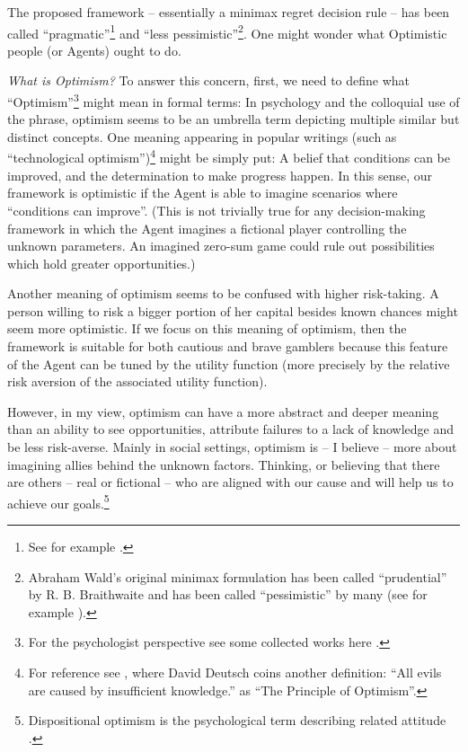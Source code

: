 \documentclass{article}
\begin{document}
The proposed framework -- essentially a minimax regret decision rule -- has been called ``pragmatic''\footnote{See for example \cite{paper:MinimaxRegretTreatment, web:minimaxregret_quickonomics}.} and  ``less pessimistic''\footnote{Abraham Wald's original minimax formulation \cite{book:Wald} has been called ``prudential'' by R. B. Braithwaite \cite{book:GoodThinking,book:ScientificExplanationBraithwaite} and has been called ``pessimistic'' by many (see for example \cite{book:ResnikDecisionTheory}).}. One might wonder what Optimistic people (or Agents) ought to do.

{\it What is Optimism?}
To answer this concern, first, we need to define what ``Optimism''\footnote{For the psychologist perspective see some collected works here \cite{book:OptimismPessimismPsychology}.} might mean in formal terms:
In psychology and the colloquial use of the phrase, optimism seems to be an umbrella term depicting multiple similar but distinct concepts.
One meaning appearing in popular writings (such as ``technological optimism'')\footnote{For reference see \cite{book:DeutschBeginningOfInfinity,web:DeutschOptimism}, where David Deutsch coins another definition: ``All evils are caused by insufficient knowledge.'' as ``The Principle of Optimism''.} might be simply put: A belief that conditions can be improved, and the determination to make progress happen.
In this sense, our framework is optimistic if the Agent is able to imagine scenarios where ``conditions can improve''. (This is not trivially true for any decision-making framework in which the Agent imagines a fictional player controlling the unknown parameters. An imagined zero-sum game could rule out possibilities which hold greater opportunities.)

Another meaning of optimism seems to be confused with higher risk-taking. A person willing to risk a bigger portion of her capital besides known chances might seem more optimistic. If we focus on this meaning of optimism, then the framework is suitable for both cautious and brave gamblers because this feature of the Agent can be tuned by the utility function (more precisely by the relative risk aversion of the associated utility function).

However, in my view, optimism can have a more abstract and deeper meaning than an ability to see opportunities, attribute failures to a lack of knowledge and be less risk-averse. Mainly in social settings, optimism is -- I believe -- more about imagining allies behind the unknown factors. Thinking, or believing that there are others -- real or fictional -- who are aligned with our cause and will help us to achieve our goals.\footnote{Dispositional optimism is the psychological term describing related attitude \cite{paper:DispositionalOptimism}.}
\end{document}
